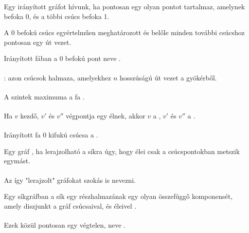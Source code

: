 \begin{frame}
\begin{tcolorbox}[title={Def.: Irányított Fa}]
Egy irányított gráfot  hívunk, ha pontosan egy olyan pontot tartalmaz, amelynek befoka 0, és a többi csúcs befoka 1.
\end{tcolorbox}

\begin{tcolorbox}[title={Ész}]
A 0 befokú csúcs egyértelműen meghatározott és belőle minden további csúcshoz pontosan egy út vezet.
\end{tcolorbox}

\begin{tcolorbox}[squeezed title={Def.: Gyökér, n-edik szint, Magasság, Szülő, Gyerekek, Levél}]
Irányított fában a 0 befokú pont neve .\\
\\
: azon csúcsok halmaza, amelyekhez $n$ hosszúságú út vezet a gyökérből.\\
\\
A szintek maximuma a fa .\\
\\
Ha $v$ kezdő, $v'$ és $v''$ végpontja egy élnek, akkor $v$ a , $v'$ és $v''$ a .\\
\\
Irányított fa 0 kifukú csúcsa a .
\end{tcolorbox}
\end{frame}


\begin{frame}
\begin{tcolorbox}[title={Def.: Síkgráf}]
Egy gráf , ha lerajzolható a síkra úgy, hogy élei csak a csúcspontokban metszik egymást.\\
\\
Az így "lerajzolt" gráfokat szokás  is nevezni.
\end{tcolorbox}

\begin{tcolorbox}[title={Def.: Tartomány}]
Egy síkgráfban a sík egy részhalmazának egy olyan összefüggő komponensét, amely diszjunkt a gráf csúcsaival, és éleivel .\\
\\
Ezek közül pontosan egy végtelen, neve .
\end{tcolorbox}
\end{frame}

